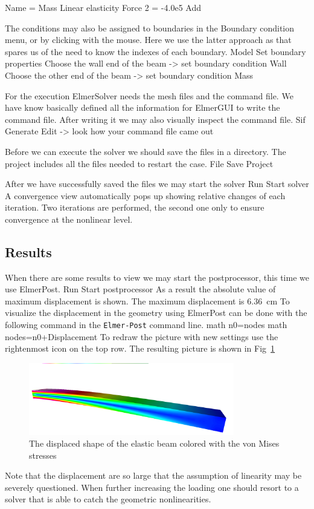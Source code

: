     Name = Mass
    Linear elasticity 
      Force 2 = -4.0e5
    Add 
\ttend   

The conditions may also be assigned to boundaries in the Boundary condition menu, or 
by clicking with the mouse. Here we use the latter approach as that spares us of the 
need to know the indexes of each boundary. 
\ttbegin
Model
  Set boundary properties
    Choose the wall end of the beam -> set boundary condition Wall
    Choose the other end of the beam -> set boundary condition Mass
\ttend

For the execution 
ElmerSolver needs the mesh files and the command file. We have know basically defined
all the information for ElmerGUI to write the command file. After writing it we may also visually 
inspect the command file.
\ttbegin
Sif 
  Generate
  Edit -> look how your command file came out  
\ttend

Before we can execute the solver we should save the files in a directory. The project includes
all the files needed to restart the case.
\ttbegin
File 
  Save Project
\ttend

After we have successfully saved the files we may start the solver
\ttbegin
Run
  Start solver
\ttend
A convergence view automatically pops up showing relative changes of each iteration.
Two iterations are performed, the second one only to ensure convergence at the nonlinear level.

\subsection*{Results}

When there are some results to view we may start the postprocessor, this time we use ElmerPost.
\ttbegin
Run
  Start postprocessor
\ttend
As a result the absolute value of maximum displacement is shown. 
The maximum displacement is $6.36$~cm 
To visualize the displacement in the geometry using ElmerPost can be done with the following
command in the \texttt{Elmer-Post} command line.
\ttbegin
  math n0=nodes
  math nodes=n0+Displacement
\ttend
To redraw the picture with new settings use the rightenmost icon on the top row.
The resulting picture is shown in Fig~\ref{fig:beam_stresses}
\begin{figure}[h!]
\begin{center}
  \includegraphics[width=0.8\textwidth,viewport=0 0 1230 300,clip]{beam_stresses}
  \caption{The displaced shape of the elastic beam colored with the 
  von Mises stresses}
  \label{fig:beam_stresses}
\end{center}
\end{figure}
Note that the displacement are so large that the assumption of linearity may be severely questioned.
When further increasing the loading one should resort to a solver that is able to catch the 
geometric nonlinearities.


